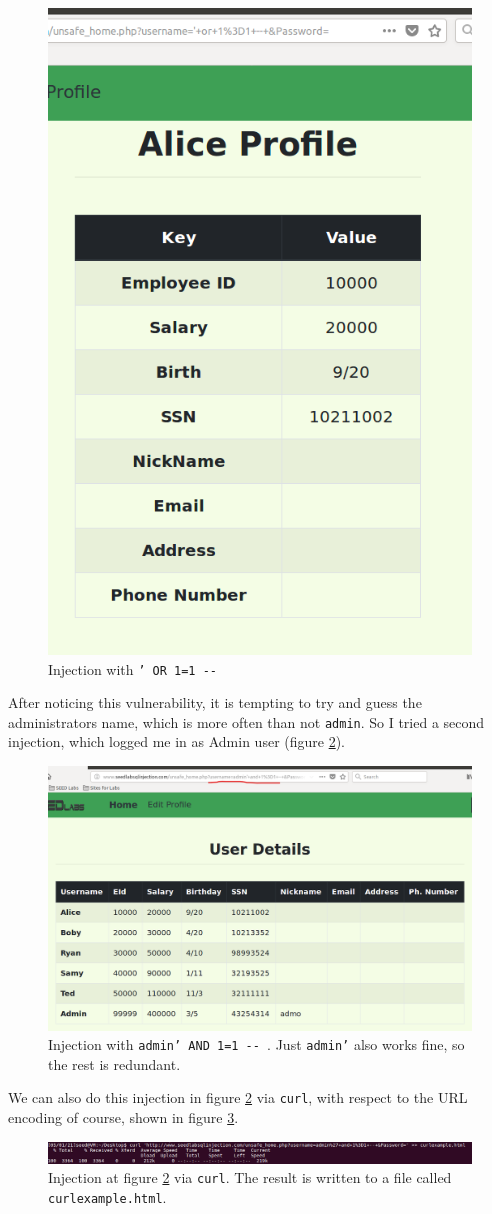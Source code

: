 \documentclass[12pt,reqno]{amsart}
\newcommand{\code}[1]{\texttt{#1}}
\begin{document}
\begin{figure}[h]
  \includegraphics[width=0.35\linewidth]{img/SQL_ALICE_INJECT.png}
  \caption{Injection with \code{' OR 1=1 -{}- }}
  \label{fig:2}
\end{figure}

After noticing this vulnerability, it is tempting to try and guess the administrators name, which is more often than not \code{admin}. So I tried a second injection, which logged me in as Admin user (figure \ref{fig:3}).

\begin{figure}[h]
  \includegraphics[width=0.7\linewidth]{img/SQL_ADMIN_INJECT.png}
  \caption{Injection with \code{admin'  AND 1=1 -{}- }. Just \code{admin'} also works fine, so the rest is redundant.}
  \label{fig:3}
\end{figure}

We can also do this injection in figure \ref{fig:3} via \code{curl}, with respect to the URL encoding of course, shown in figure \ref{fig:4}.

\begin{figure}[h]
  \includegraphics[width=\linewidth]{img/CURL_EXAMPLE_CMD.png}
  \caption{Injection at figure \ref{fig:3} via \code{curl}. The result is written to a file called \code{curlexample.html}.}
  \label{fig:4}
\end{figure}
\end{document}
